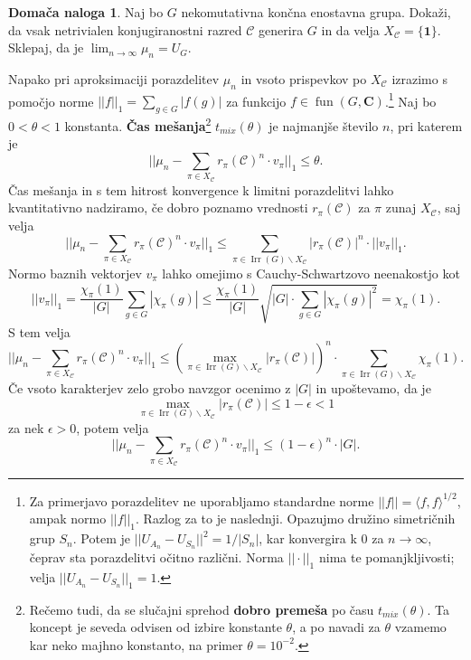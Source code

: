 \documentclass[11pt]{book}
\def\CC{\mathbf{C}}
\def\conclass{\mathcal{C}}
\def\oneone{\mathbf{1}}
\DeclareMathOperator\Irr{Irr}
\DeclareMathOperator\fun{fun}
\def\definicija{\color{rdeca}\bf}
\theoremstyle{definition}
\theoremstyle{zgled}
\theoremstyle{zgledbrezstevilke}
\theoremstyle{odprtproblem}
\theoremstyle{domacanaloga}
\newtheorem{domacanaloga}[theorem]{Domača naloga}
\theoremstyle{izrek}
\begin{document}
\begin{domacanaloga}
Naj bo $G$ nekomutativna končna enostavna grupa. Dokaži, da vsak netrivialen konjugiranostni razred $\conclass$ generira $G$ in da velja $X_{\conclass} = \{ \oneone \}$. Sklepaj, da je $\lim_{n \to \infty} \mu_n = U_G$.
\end{domacanaloga}

Napako pri aproksimaciji porazdelitev $\mu_n$ in vsoto prispevkov po $X_{\conclass}$ izrazimo s pomočjo norme $||f||_1 = \sum_{g \in G} |f(g)|$ za funkcijo $f \in \fun(G,\CC)$.\footnote{Za primerjavo porazdelitev ne uporabljamo standardne norme $||f|| = \langle f, f \rangle^{1/2}$, ampak normo $||f||_1$. Razlog za to je naslednji. Opazujmo družino simetričnih grup $S_n$. Potem je $||U_{A_n} - U_{S_n}||^2 = 1/|S_n|$, kar konvergira k $0$ za $n \to \infty$, čeprav sta porazdelitvi očitno različni. Norma $||\cdot||_1$ nima te pomanjkljivosti; velja $||U_{A_n} - U_{S_n}||_1 = 1$.} Naj bo $0 < \theta < 1$ konstanta. {\definicija Čas mešanja}\footnote{Rečemo tudi, da se slučajni sprehod {\definicija dobro premeša} po času $t_{mix}(\theta)$. Ta koncept je seveda odvisen od izbire konstante $\theta$, a po navadi za $\theta$ vzamemo kar neko majhno konstanto, na primer $\theta = 10^{-2}$.} $t_{mix}(\theta)$ je  najmanjše število $n$, pri katerem je 
\[
    || \mu_n -  \sum_{\pi \in X_{\conclass}} r_{\pi}(\conclass)^n \cdot v_{\pi} ||_1  \leq \theta.
\]
Čas mešanja in s tem hitrost konvergence k limitni porazdelitvi lahko kvantitativno nadziramo, če dobro poznamo vrednosti $r_{\pi}(\conclass)$ za $\pi$ zunaj $X_{\conclass}$, saj velja
\[
    || \mu_n -  \sum_{\pi \in X_{\conclass}} r_{\pi}(\conclass)^n \cdot v_{\pi} ||_1
    \leq
    \sum_{\pi \in \Irr(G) \backslash X_{\conclass}} |r_{\pi}(\conclass)|^n \cdot ||v_{\pi}||_1.
\]
Normo baznih vektorjev $v_{\pi}$ lahko omejimo s Cauchy-Schwartzovo neenakostjo kot
\[
    ||v_{\pi}||_1 = \frac{\chi_{\pi}(1)}{|G|} \sum_{g \in G} |\chi_{\pi}(g)|
    \leq \frac{\chi_{\pi}(1)}{|G|} \sqrt{|G| \cdot \sum_{g \in G} |\chi_{\pi}(g)|^2}
    = \chi_{\pi}(1).
\]
S tem velja
\[
    || \mu_n -  \sum_{\pi \in X_{\conclass}} r_{\pi}(\conclass)^n \cdot v_{\pi} ||_1
    \leq \left( \max_{\pi \in \Irr(G) \backslash X_{\conclass}} |r_{\pi}(\conclass)| \right)^n  \cdot \sum_{\pi \in \Irr(G) \backslash X_{\conclass}} \chi_{\pi}(1).
\]
Če vsoto karakterjev zelo grobo navzgor ocenimo z $|G|$ in upoštevamo, da je 
\[
    \max_{\pi \in \Irr(G) \backslash X_{\conclass}} |r_{\pi}(\conclass)|  \leq 1 - \epsilon < 1
\]
za nek $\epsilon > 0$, potem velja
\[
    || \mu_n -  \sum_{\pi \in X_{\conclass}} r_{\pi}(\conclass)^n \cdot v_{\pi} ||_1
    \leq (1 - \epsilon)^n \cdot |G|.
\]
\end{document}

